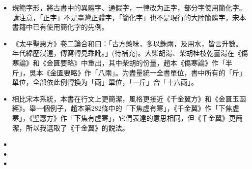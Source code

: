 \begin{itemize}
	\item 規範字形，將古書中的異體字、通假字，一律改为正字，部分字使用簡化字。請注意，「正字」不是臺灣正體字，「簡化字」也不是現行的大陸簡體字，宋本書籍中已有使用簡化字的先例。
	
	\item 《太平聖惠方》卷二論合和曰：「古方藥味，多以銖兩，及用水，皆言升數。年代綿歷浸遠，傳寫轉見乖訛。」(待補充)。大柴胡湯、柴胡桂枝乾薑湯在《傷寒論》和《金匱要略》中重出，其中柴胡的份量，趙本《傷寒論》作「半斤」，吳本《金匱要略》作「八兩」。为盡量統一全書單位，書中所有的「斤」單位，全部依此例轉換为「兩」單位，「一斤」合「十六兩」。
	
	\item 相比宋本系統，本書在行文上更簡潔，風格更接近《千金翼方》和《金匱玉函經》。舉一個例子，趙本第282條中的「下焦虗有寒」，《千金翼》作「下焦虗寒」，《聖惠方》作「下焦有虗寒」，它們表達的意思相同，但《千金翼》更簡潔，所以我選取了《千金翼》的説法。
	
	\item 
	
	\item 
	
	\item 
	
\end{itemize}























\endinput
